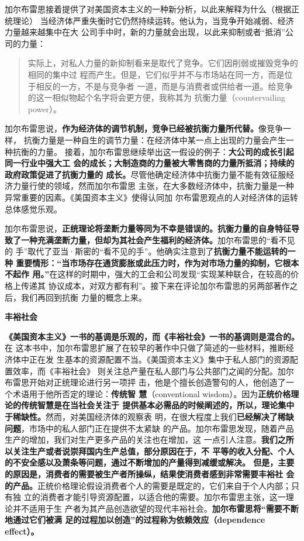 加尔布雷思接着提供了对美国资本主义的一种新分析，以此来解释为什么（根据正统理论）
当经济体严重失衡时它仍然持续运转。他认为，当竞争开始减弱、经济力量越来越集中在大
公司手中时，新的力量就会出现，以此来抑制或者“抵消”公司的力量：

\begin{quotation}
  实际上，对私人力量的新抑制看来是取代了竞争。它们因削弱或摧毁竞争的相同的集中过
  程而产生。但是，它们似乎并不与市场站在同一方，而是位于相反的一方，不是与竞争者
  一道，而是与消费者或供给者一道。给竞争的这一相似物起个名字将会更方便，我称其为
  抗衡力量（countervailing power）。
\end{quotation}

加尔布雷思说，\textbf{作为经济体的调节机制，竞争已经被抗衡力量所代替。}像竞争一样，
抗衡力量是一种自生的调节力量：在经济体中某一点上出现的力量会产生一种抗衡的力量。
接着，加尔布雷思继续举出这一假设的例子：\textbf{大公司的成长引起同一行业中强大工
  会的成长；大制造商的力量被大零售商的力量所抵消；持续的政府政策促进了抗衡力量的
  成长。}尽管他确定经济体中抗衡力量不能有效征服经济力量行使的领域，然而加尔布雷思
主张，在大多数经济体中，抗衡力量是一种异常重要的因素。《美国资本主义》使得认同加
尔布雷思观点的人对经济体的运转总体感觉乐观。

加尔布雷思说，\textbf{正统理论将垄断力量等同为不幸是错误的。抗衡力量的自身特征导
  致了一种充满垄断力量，但却为其社会产生福利的经济体。}加尔布雷思的“看不见的
手”取代了亚当·斯密的“看不见的手”。他确实注意到了\textbf{抗衡力量不能运转的一种
  重要情形：“当市场存在通货膨胀或此压力时，作为对市场力量的抑制，它根本不起作
  用。”}在这样的时期中，强大的工会和公司发现“实现某种联合，在较高的价格上传递其
协议成本，对双方都有利”。接下来在评论加尔布雷思的另两部著作之后，我们再回到抗衡
力量的概念上来。

\textbf{\sffamily 丰裕社会}

\textbf{《美国资本主义》一书的基调是乐观的，而《丰裕社会》一书的基调则是混合的。}在
这本书中，加尔布雷思扩展了在较早的著作中只做了简述的一些材料，推断经济体中正在发
生基本的资源配置不当。《美国资本主义》集中于私人部门的资源配置效率，而《丰裕社会》
则关注总产量在私人部门与公共部门之闻的分配。加尔布雷思开始对正统理论进行另一项抨
击，他是个擅长创造警句的人，他创造了一个术语用于他所否定的理论：\textbf{传统智
  慧}（conventional wisdom）。因为\textbf{正统价格理论的传统智慧是在当社会关注于
  提供基本必需品的时候阐述的，所以，理论集中于稀缺性。}然而，对美国经济体的观察表
明，在很大程度上我们\textbf{已经解决了稀缺问题}，市场中的私人部门正在提供不太紧缺
的产品。加尔布雷思发现，随着产品生产的增加，我们对生产更多产品的关注也在增加，这
一点引人注意。\textbf{我们之所以关注生产或者说崇拜国内生产总值，部分原因在于，不
  平等的收入分配、个人的不安全感以及萧条等问题，通过不断增加的产量得到减缓或解决。
  但是，主要的原因是，消费者的需要被生产者所操纵，结果使消费者感到非常需要丰裕社
  会的产品。}正统价格理论假设消费者个人的需要是既定的，它们来自于个人内部；只有独
立的消费者才能引导资源配置，以适合他的需要。加尔布雷思主张，这一理论并不适用于生
产者为其产品创造欲望的现代丰裕社会。\textbf{加尔布雷思将“需要不断地通过它们被满
  足的过程加以创造”的过程称为依赖效应（dependence effect）。}

